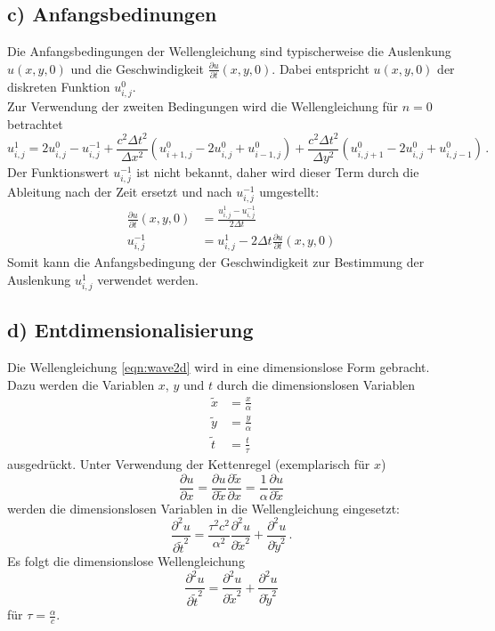 \subsection{c) Anfangsbedinungen}
Die Anfangsbedingungen der Wellengleichung sind typischerweise die Auslenkung $u(x,y,0)$ und die Geschwindigkeit $\frac{\partial u}{\partial t}(x,y,0)$.
Dabei entspricht $u(x,y,0)$ der diskreten Funktion $u_{i,j}^0$.
\\
Zur Verwendung der zweiten Bedingungen wird die Wellengleichung für $n=0$ betrachtet
\begin{equation}
    u_{i,j}^1 = 2 u_{i,j}^0 - u_{i,j}^{-1} + \frac{c^2 \Delta t^2}{\Delta x^2} \left( u_{i+1,j}^0 - 2 u_{i,j}^0 + u_{i-1,j}^0 \right) + \frac{c^2 \Delta t^2}{\Delta y^2} \left( u_{i,j+1}^0 - 2 u_{i,j}^0 + u_{i,j-1}^0 \right) \, .
\end{equation}
Der Funktionswert $u_{i,j}^{-1}$ ist nicht bekannt, daher wird dieser Term durch die Ableitung nach der Zeit ersetzt und nach $u_{i,j}^{-1}$ umgestellt:
\begin{align}
    \frac{\partial u}{\partial t}(x,y,0) &= \frac{u_{i,j}^1 - u_{i,j}^{-1}}{2 \Delta t}\\
    u_{i,j}^{-1} &= u_{i,j}^1 - 2 \Delta t \frac{\partial u}{\partial t}(x,y,0)
\end{align}
Somit kann die Anfangsbedingung der Geschwindigkeit zur Bestimmung der Auslenkung $u_{i,j}^{1}$ verwendet werden.

\subsection{d) Entdimensionalisierung}
Die Wellengleichung \autoref{eqn:wave2d} wird in eine dimensionslose Form gebracht.
Dazu werden die Variablen $x$, $y$ und $t$ durch die dimensionslosen Variablen
\begin{align*}
    \tilde{x} &= \frac{x}{\alpha} \\
    \tilde{y} &= \frac{y}{\alpha} \\
    \tilde{t} &= \frac{t}{\tau}
\end{align*}
ausgedrückt.
Unter Verwendung der Kettenregel (exemplarisch für $x$)
\begin{equation}
    \frac{\partial u}{\partial x} = \frac{\partial u}{\partial \tilde{x}} \frac{\partial \tilde{x}}{\partial x} = \frac{1}{\alpha} \frac{\partial u}{\partial \tilde{x}}
\end{equation}
werden die dimensionslosen Variablen in die Wellengleichung eingesetzt:
\begin{equation}
    \frac{\partial^2 u}{\partial \tilde{t}^2} = \frac{\tau ^2 c^2}{\alpha^2} \frac{\partial^2 u}{\partial \tilde{x}^2} + \frac{\partial^2 u}{\partial \tilde{y}^2} \, .
\end{equation}
Es folgt die dimensionslose Wellengleichung
\begin{equation}
    \frac{\partial^2 u}{\partial \tilde{t}^2} = \frac{\partial^2 u}{\partial \tilde{x}^2} + \frac{\partial^2 u}{\partial \tilde{y}^2}
    \label{eqn:wave2d_dimless}
\end{equation}
für $\tau = \frac{\alpha}{c}$.

